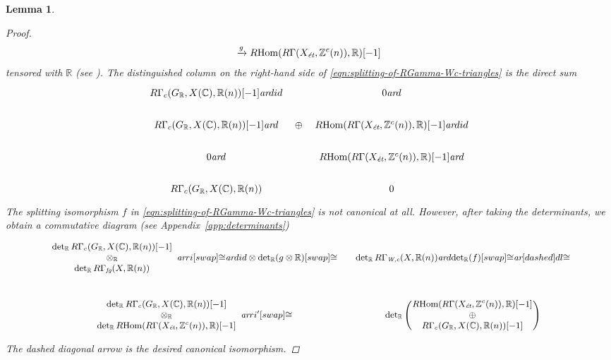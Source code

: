 \documentclass[10pt,a4paper,oneside,draft]{article}
\DeclareMathOperator{\Hom}{Hom}
\newcommand{\CC}{\mathbb{C}}
\newcommand{\RR}{\mathbb{R}}
\newcommand{\ZZ}{\mathbb{Z}}
\renewcommand{\det}{\operatorname{det}}
\newcommand{\ar}{\text{\it ar}}
\newcommand{\et}{\text{\it \'{e}t}}
\newcommand{\fg}{\text{\it fg}}
\newcommand{\Wc}{\text{\it W,c}}
\newcommand{\RHom}{R\!\Hom}
\theoremstyle{myplain}
\newtheorem{lemma}[theorem]{Lemma}
\theoremstyle{mydefinition}
\numberwithin{equation}{section}
\begin{document}
\begin{lemma}
\begin{proof}
\begin{multline*}
      \xrightarrow{g} \RHom (R\Gamma (X_\et, \ZZ^c (n)), \RR) [-1]
    \end{multline*}
    tensored with $\RR$ (see \cite[Proposition~5.7]{Beshenov-Weil-etale-1}).
    The distinguished column on the right-hand side of
    \eqref{eqn:splitting-of-RGamma-Wc-triangles} is the direct sum
    \[ \begin{tikzcd}[row sep=1.5em]
        R\Gamma_c (G_\RR, X (\CC), \RR (n)) [-1]\ar{d}{id} &[-2em] &[-2em] 0\ar{d} \\
        R\Gamma_c (G_\RR, X (\CC), \RR (n)) [-1]\ar{d} & \oplus & \RHom (R\Gamma (X_\et, \ZZ^c (n)), \RR) [-1]\ar{d}{id} \\
        0 \ar{d} & & \RHom (R\Gamma (X_\et, \ZZ^c (n)), \RR) [-1] \ar{d} \\
        R\Gamma_c (G_\RR, X (\CC), \RR (n)) & & 0
      \end{tikzcd} \]
    The splitting isomorphism $f$ in
    \eqref{eqn:splitting-of-RGamma-Wc-triangles} is not canonical at
    all. However, after taking the determinants, we obtain a commutative diagram
    (see Appendix~\ref{app:determinants})
    \[ \begin{tikzcd}[column sep=1em, font=\small]
        \begin{array}{c} \det_\RR R\Gamma_c (G_\RR, X (\CC), \RR (n)) [-1] \\ \otimes_\RR \\ \det_\RR R\Gamma_\fg (X, \RR(n)) \end{array} \ar{r}{i}[swap]{\cong} \ar{d}{id \otimes \det_\RR (g\otimes \RR)}[swap]{\cong} & \det_\RR R\Gamma_\Wc (X, \RR (n)) \ar{d}{\det_\RR (f)}[swap]{\cong}\ar[dashed]{dl}{\cong} \\
        \begin{array}{c} \det_\RR R\Gamma_c (G_\RR, X (\CC), \RR (n)) [-1] \\ \otimes_\RR \\ \det_\RR \RHom (R\Gamma (X_\et, \ZZ^c (n)), \RR) [-1] \end{array} \ar{r}{i'}[swap]{\cong} & \det_\RR \left(\!\!\!\begin{array}{c} \RHom (R\Gamma (X_\et, \ZZ^c (n)), \RR) [-1] \\ \oplus \\ R\Gamma_c (G_\RR, X (\CC), \RR (n)) [-1] \end{array}\!\!\!\right)
      \end{tikzcd} \]
    The dashed diagonal arrow is the desired canonical isomorphism.
  \end{proof}
\end{lemma}
\end{document}

